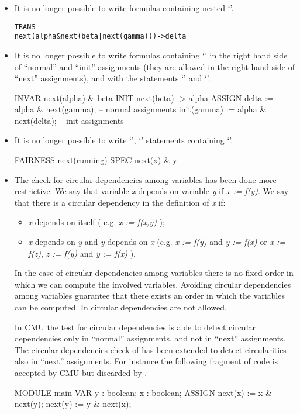 \begin{itemize}
\item It is no longer possible to write formulas containing nested
`'.
\begin{alltt}
TRANS
  next(alpha & next(beta | next(gamma))) -> delta
\end{alltt}
\item It is no longer possible to write formulas containing
`' in the right hand side of ``normal'' and ``init''
assignments (they are allowed in the right hand side of ``next''
assignments), and with the statements `' and
`'.
\begin{nusmvCode}
INVAR
  next(alpha) & beta
INIT
  next(beta) -> alpha
ASSIGN
  delta := alpha & next(gamma);       -- normal assignments
  init(gamma) := alpha & next(delta); -- init assignments
\end{nusmvCode}
\item It is no longer possible to write `',
`' statements containing `'.
\begin{nusmvCode}
FAIRNESS
 next(running)
SPEC
 next(x) & y
\end{nusmvCode}
\item The check for circular dependencies among variables has been 
done more restrictive.
We say that variable {\it x} depends on variable {\it y} if {\it x := f(y)}.
We say that there is a circular dependency in the definition of {\it x} if:
\begin{itemize}
\item  {\it x} depends on itself ( e.g. {\it x := f(x,y)} );
\item {\it x} depends on {\it y} and {\it y} depends on {\it x} (e.g. {\it x :=
f(y)} and {\it y := f(x)} or {\it x := f(z)}, {\it z := f(y)} and {\it y :=
f(x)} ).
\end{itemize}
In the case of circular dependencies among variables there is no fixed
order in which we can compute the involved variables. Avoiding circular
dependencies among variables guarantee that there exists an order in
which the variables can be computed. In \nusmv circular
dependencies are not allowed.

In CMU \smv the test for circular dependencies is able to detect
circular dependencies only in ``normal'' assignments, and not in ``next''
assignments. The circular dependencies check of \nusmv has been
extended to detect circularities also in ``next'' assignments. For
instance the following fragment of code is accepted by CMU \smv
but discarded by \nusmv.
\begin{nusmvCode}
MODULE main
VAR
  y : boolean;
  x : boolean;
ASSIGN
  next(x) := x & next(y);
  next(y) := y & next(x);
\end{nusmvCode}
\end{itemize}

